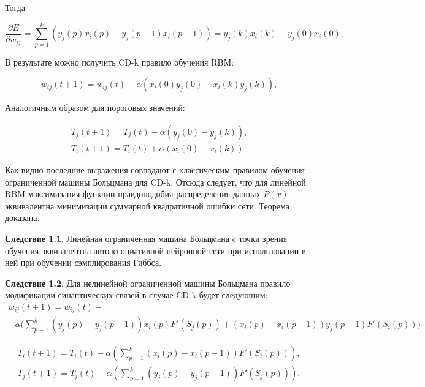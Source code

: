 Тогда

\begin{equation*}
    \frac{\partial E}{\partial w_{ij}}=\sum_{p=1}^k (y_j(p)x_i(p)-y_j(p-1)x_i(p-1))=y_j(k)x_i(k)-y_j(0)x_i(0),
\end{equation*}

В результате можно получить CD-k правило обучения RBM:

\begin{equation*}
    w_{ij}(t+1)=w_{ij}(t)+\alpha(x_i(0)y_j(0)-x_i(k)y_j(k)),
\end{equation*}

Аналогичным образом для пороговых значений:

\begin{equation*}
\begin{aligned}
    T_{j}(t+1)=T_{j}(t)+\alpha(y_j(0)-y_j(k)),\\
    T_{i}(t+1)=T_{i}(t)+\alpha(x_i(0)-x_i(k))
\end{aligned}
\end{equation*}

Как видно последние выражения совпадают с классическим правилом обучения ограниченной машины Больцмана для CD-k. Отсюда следует, что для линейной RBM максимизация функции правдоподобия распределения данных $P(x)$ эквивалентна минимизации суммарной квадратичной ошибки сети. Теорема доказана.

\textbf{Следствие 1.1}. Линейная ограниченная машина Больцмана c точки зрения обучения эквивалентна автоассоциативной нейронной сети при использовании в ней при обучении сэмплирования Гиббса.

\textbf{Следствие 1.2}. Для нелинейной ограниченной машины Больцмана правило модификации синаптических связей в случае CD-k будет следующим:
\begin{multline*}
    w_{ij}(t+1)=w_{ij}(t)-\\-\alpha\Bigg(\sum_{p=1}^k (y_j(p)-y_j(p-1))x_i(p)F'(S_j(p))+(x_i(p)-x_i(p-1))y_j(p-1)F'(S_i(p))\Bigg)
\end{multline*}

\begin{equation*}
\begin{aligned}
    T_i(t+1)=T_i(t)-\alpha\left(\sum_{p=1}^k (x_i(p)-x_i(p-1))F'(S_i(p))\right),\\
    T_j(t+1)=T_j(t)-\alpha\left(\sum_{p=1}^k (y_j(p)-y_j(p-1))F'(S_j(p))\right),
\end{aligned}
\end{equation*}

